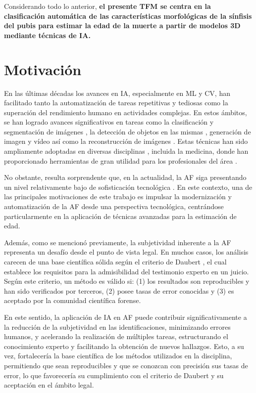 Considerando todo lo anterior, \textbf{el presente TFM se centra en la clasificación automática de las características morfológicas de la sínfisis del pubis para estimar la edad de la muerte a partir de modelos 3D mediante técnicas de IA.}

\section{Motivación}
En las últimas décadas los avances en IA, especialmente en ML y CV, han facilitado tanto la automatización de tareas repetitivas y tediosas como la superación del rendimiento humano en actividades complejas. En estos ámbitos, se han logrado avances significativos en tareas como la clasificación y segmentación de imágenes \cite{edozie_comprehensive_2025}, la detección de objetos en las mismas \cite{liu_deep_2020}, generación de imagen y vídeo \cite{wang_generative_2021} así como la reconstrucción de imágenes \cite{xie_review_2022}. Estas técnicas han sido ampliamente adoptadas en diversas disciplinas \cite{chai_deep_2021}, incluida la medicina, donde han proporcionado herramientas de gran utilidad para los profesionales del área \cite{esteva_deep_2021}.

No obstante, resulta sorprendente que, en la actualidad, la AF siga presentando un nivel relativamente bajo de sofisticación tecnológica \cite{RefWorks:RefID:21-mesejo2020survey}. En este contexto, una de las principales motivaciones de este trabajo es impulsar la modernización y automatización de la AF desde una perspectiva tecnológica, centrándose particularmente en la aplicación de técnicas avanzadas para la estimación de edad.

Además, como se mencionó previamente, la subjetividad inherente a la AF representa un desafío desde el punto de vista legal. En muchos casos, los análisis carecen de una base científica sólida según el criterio de Daubert \cite{noauthor_daubert_nodate}, el cual establece los requisitos para la admisibilidad del testimonio experto en un juicio. Según este criterio, un método es válido si: (1) los resultados son reproducibles y han sido verificados por terceros, (2) posee tasas de error conocidas y (3) es aceptado por la comunidad científica forense.

En este sentido, la aplicación de IA en AF puede contribuir significativamente a la reducción de la subjetividad en las identificaciones, minimizando errores humanos, y acelerando la realización de múltiples tareas, estructurando el conocimiento experto y facilitando la obtención de nuevos hallazgos. Esto, a su vez, fortalecería la base científica de los métodos utilizados en la disciplina, permitiendo que sean reproducibles y que se conozcan con precisión sus tasas de error, lo que favorecería su cumplimiento con el criterio de Daubert y su aceptación en el ámbito legal.

